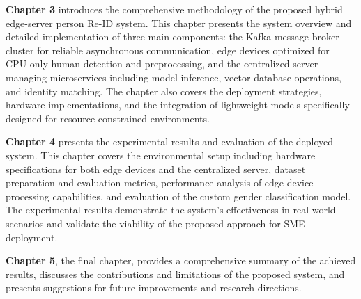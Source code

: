 \documentclass[../main.tex]{subfiles}
\begin{document}
\textbf{Chapter 3} introduces the comprehensive methodology of the proposed hybrid edge-server person Re-ID system. This chapter presents the system overview and detailed implementation of three main components: the Kafka message broker cluster for reliable asynchronous communication, edge devices optimized for CPU-only human detection and preprocessing, and the centralized server managing microservices including model inference, vector database operations, and identity matching. The chapter also covers the deployment strategies, hardware implementations, and the integration of lightweight models specifically designed for resource-constrained environments.

\textbf{Chapter 4} presents the experimental results and evaluation of the deployed system. This chapter covers the environmental setup including hardware specifications for both edge devices and the centralized server, dataset preparation and evaluation metrics, performance analysis of edge device processing capabilities, and evaluation of the custom gender classification model. The experimental results demonstrate the system's effectiveness in real-world scenarios and validate the viability of the proposed approach for SME deployment.

\textbf{Chapter 5}, the final chapter, provides a comprehensive summary of the achieved results, discusses the contributions and limitations of the proposed system, and presents suggestions for future improvements and research directions.
\end{document}
